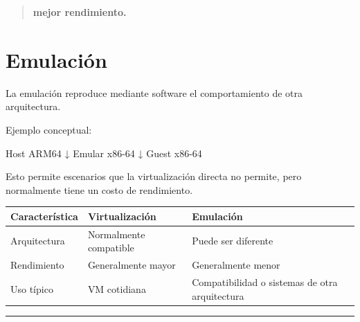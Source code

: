 \documentclass[
  spanish,
  letterpaper,
]{scrbook}
\newenvironment{Shaded}{\begin{snugshade}}{\end{snugshade}}
\newcommand{\NormalTok}[1]{\textcolor[rgb]{0.00,0.23,0.31}{#1}}
\newcounter{none} %
\begin{document}
\begin{quote}
\textbf{mejor rendimiento.}
\end{quote}

\section{Emulación}\label{emulaciuxf3n}

La emulación reproduce mediante software el comportamiento de otra
arquitectura.

Ejemplo conceptual:

\begin{Shaded}
\begin{Highlighting}[]
\NormalTok{Host ARM64}
\NormalTok{    ↓}
\NormalTok{Emular x86{-}64}
\NormalTok{    ↓}
\NormalTok{Guest x86{-}64}
\end{Highlighting}
\end{Shaded}

Esto permite escenarios que la virtualización directa no permite, pero
normalmente tiene un costo de rendimiento.

{\def\LTcaptype{none} %
\begin{longtable}[]{@{}
  >{\raggedright\arraybackslash}p{}
  >{\raggedright\arraybackslash}p{}
  >{\raggedright\arraybackslash}p{}@{}}
\toprule\noalign{}
\begin{minipage}[b]{\linewidth}\raggedright
Característica
\end{minipage} & \begin{minipage}[b]{\linewidth}\raggedright
Virtualización
\end{minipage} & \begin{minipage}[b]{\linewidth}\raggedright
Emulación
\end{minipage} \\
\midrule\noalign{}
\endhead
\bottomrule\noalign{}
\endlastfoot
Arquitectura & Normalmente compatible & Puede ser diferente \\
Rendimiento & Generalmente mayor & Generalmente menor \\
Uso típico & VM cotidiana & Compatibilidad o sistemas de otra
arquitectura \\
\end{longtable}
}

\begin{center}\rule{0.5\linewidth}{0.5pt}\end{center}
\end{document}
